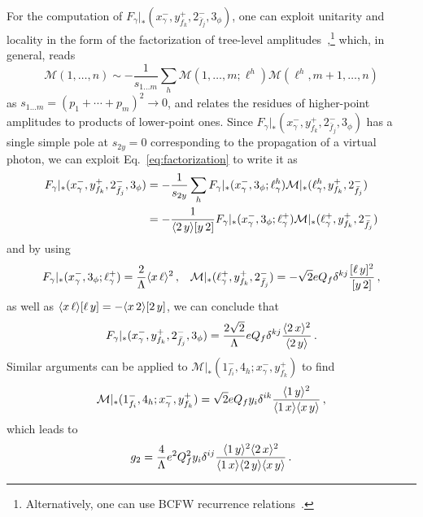 For the computation of $F_\gamma|_*(x_\gamma^{-},y_{ f_k}^{+},2_{\bar f_j}^-,3_\phi)$, 
one can exploit unitarity and locality in the form of the factorization of tree-level amplitudes~\cite{Benincasa:2007xk,Arkani-Hamed:2017jhn,Mangano:1990by,Dixon:1996wi},\footnote{Alternatively, one can use BCFW recurrence relations~\cite{Britto:2004ap,Britto:2005fq}.} which, in general, reads
\begin{equation}\label{eq:factorization}
    \mathcal M(1,\dotsc,n) \sim -\frac{1}{s_{1\dots m}}\sum_h\mathcal M(1,\dotsc,m; \ell^h) \mathcal M( \ell^h,m+1,\dotsc,n) 
\end{equation}
as $s_{1\dots m}=(p_1+\dotsb+ p_m)^2\to 0$, and relates the residues of higher-point amplitudes to products of lower-point ones.
Since $F_\gamma|_*(x_\gamma^{-},y_{ f_k}^{+},2_{\bar f_j}^-,3_\phi)$ has a single simple pole at $s_{2y}=0$ corresponding to the propagation of a virtual photon, we can exploit Eq.~\eqref{eq:factorization} to write it as
\begin{align}
    F_\gamma|_*(x_\gamma^{-},y_{ f_k}^{+},2_{\bar f_j}^-,3_\phi) &= -\frac{1}{s_{2y}}\sum_h F_\gamma|_*(x_\gamma^{-},3_\phi;\ell^h_\gamma)\mathcal M|_*(\ell^h_\gamma,y_{ f_k}^{+},2_{\bar f_j}^-)\nonumber \\
    &= -\frac{1}{\langle2\, y \rangle\lbrack y\, 2 \rbrack} F_\gamma|_*(x_\gamma^{-},3_\phi;\ell^+_\gamma)\mathcal M|_*(\ell^+_\gamma,y_{ f_k}^{+},2_{\bar f_j}^-)
\end{align}
and by using
\begin{align}
    F_\gamma|_*(x_\gamma^{-},3_\phi;\ell^+_\gamma) = \frac{2}{\Lambda}\langle x\, \ell \rangle^2\,, && 
    \mathcal M|_*(\ell^+_\gamma,y_{ f_k}^{+},2_{\bar f_j}^-) =- \sqrt 2 e Q_f \delta^{kj}\frac{\lbrack \ell\, y \rbrack^2}{\lbrack y\, 2 \rbrack}\,,
\end{align}
as well as $\langle x\, \ell \rangle\lbrack \ell\, y \rbrack=-\langle x\, 2 \rangle\lbrack 2\, y \rbrack$, we can conclude that
\begin{equation}
    F_\gamma|_*(x_\gamma^{-},y_{ f_k}^{+},2_{\bar f_j}^-,3_\phi) = \frac{2\sqrt 2}{\Lambda}eQ_f \delta^{kj} \frac{\langle2\, x \rangle^2}{\langle2\, y \rangle}\,.
\end{equation}
Similar arguments can be applied to $\mathcal M|_*(1_{ f_i}^-,4_h;x_\gamma^{-},y_{ f_k}^{+})$ to find
\begin{equation}
    \mathcal M|_*(1_{ f_i}^-,4_h;x_\gamma^{-},y_{ f_k}^{+}) = \sqrt 2 e Q_f y_i \delta^{ik} \frac{\langle1\, y \rangle^2}{\langle1\, x \rangle\langle x\, y \rangle}\,,
\end{equation}
which leads to
\begin{equation}\label{eq:exprB}
    g_2= \frac{4}{\Lambda}e^2 Q_f^2 y_i\delta^{ij}\frac{\langle1\, y \rangle^2\langle2\, x \rangle^2}{\langle1\, x \rangle\langle2\, y \rangle\langle x\, y \rangle}\,.
\end{equation}


